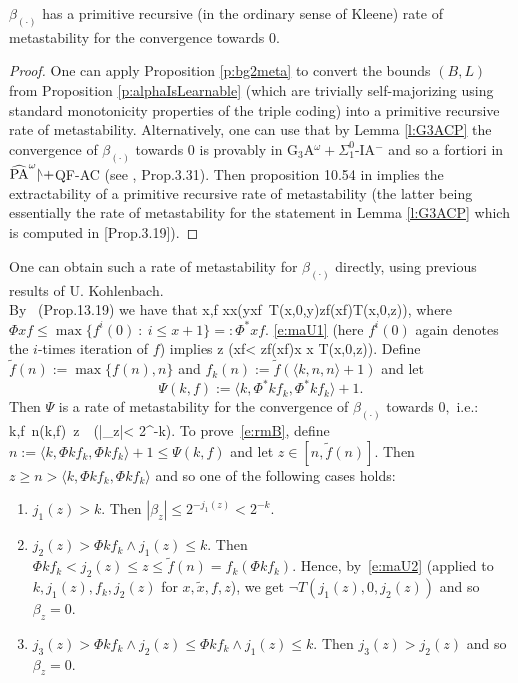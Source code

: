 \begin{cor} \label{metastability-alpha}
$\beta_{(\cdot)}$ has a primitive recursive (in the ordinary sense 
of Kleene) rate of metastability for the convergence towards $0.$
\end{cor}
\begin{proof} One can apply Proposition \ref{p:bg2meta} to convert 
the bounds $(B,L)$ from Proposition \ref{p:alphaIsLearnable} (which are 
trivially self-majorizing using standard monotonicity properties of the 
triple coding) into a primitive 
recursive rate of metastability. Alternatively, one can use that by 
Lemma \ref{l:G3ACP} the convergence of $\beta_{(\cdot)}$ towards $0$ 
is provably in 
G$_3$A$^{\omega}+\Sigma^0_1$-IA$^-$ and so a fortiori  in 
$\widehat{\rm PA}^{\omega}\res+$QF-AC (see \cite{Kohlenbach08}, Prop.3.31).
Then proposition 10.54 in \cite{Kohlenbach08} implies the extractability 
of a primitive recursive rate of metastability (the latter being essentially 
the rate of metastability for the statement in Lemma \ref{l:G3ACP} 
which is computed in \cite{Kohlenbach08}[Prop.3.19]).
\end{proof} 

\begin{rmk}\label{r:metaB}
One can obtain such a rate of metastability for $\beta_{(\cdot)}$ directly, using previous results
of U. Kohlenbach.\\
By~\cite{Kohlenbach08} (Prop.13.19) we have that
\be[e:maU1]
\forall x,f \forall \tilde x\leq x\big(\exists y\leq\Phi xf\ T(\tilde x,0,y)\vee \forall z\leq f(\Phi xf)\neg T(\tilde x,0,z)\big),
\ee
where $\Phi xf\leq \max\{f^{i}(0)\ 
:\ i\leq x+1\}=:\Phi^*xf$. \eqref{e:maU1} (here $f^i(0)$ again denotes the 
$i$-times iteration of $f$) implies
\be[e:maU2]
\forall z \big(\Phi xf< z\leq f(\Phi xf)\rightarrow \forall \tilde x \leq x \neg T(\tilde x,0,z)\big).
\ee
Define $\tilde f(n):=\max\{f(n),n\}$ and $f_k(n):=\tilde f(\langle k,n,n\rangle+1)$ and let
\[
\Psi(k,f):=\langle k,\Phi^*kf_k,\Phi^*kf_k\rangle + 1.
\]
Then $\Psi$ is a rate of metastability for the convergence of 
$\beta_{(\cdot)}$ towards $0,$ i.e.:
\be[e:rmB]
\forall k,f\ \exists n\leq \Psi(k,f)\ \forall z\in[n,\tilde f(n)]\ \ 
(|\beta_z|< 2^{-k}).
\ee
To prove~\eqref{e:rmB}, define $n:=\langle k, \Phi kf_k, \Phi kf_k\rangle+1\leq\Psi(k,f)$ and let $z\in[n,\tilde f(n)]$. Then 
$z\geq n > \langle k, \Phi kf_k, \Phi kf_k\rangle$ and so one of the following cases holds:
\hspace{35mm}\begin{enumerate}
\item $j_1(z)>k$. Then $|\beta_z|\leq2^{-j_1(z)}<2^{-k}$.
\item $j_2(z)>\Phi kf_k\wedge j_1(z)\leq k$. Then 
$
\Phi kf_k < j_2(z)\leq z \leq \tilde f(n)=f_k(\Phi kf_k).
$
Hence, by~\eqref{e:maU2} (applied to $k,j_1(z),f_k,j_2(z)$ 
for $x, \tilde{x}, f, z$), we get 
$\neg T(j_1(z),0,j_2(z))$ and so $\beta_z=0$.
\item $j_3(z)>\Phi kf_k\wedge j_2(z)\leq\Phi kf_k\wedge j_1(z)\leq k$. Then $j_3(z)>j_2(z)$ and so $\beta_z=0$.
\end{enumerate}
\end{rmk}

